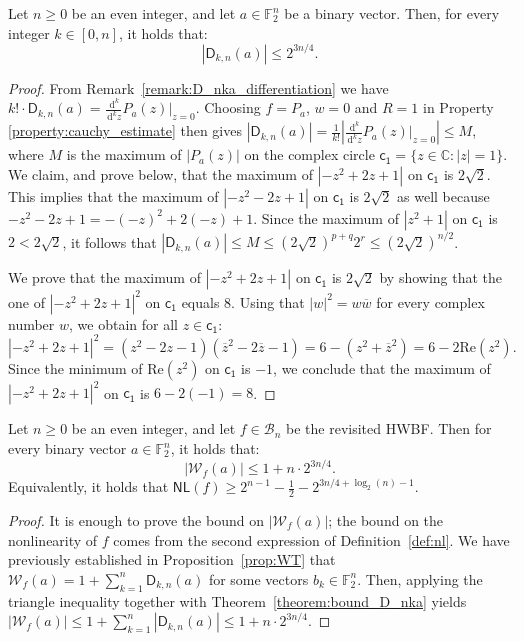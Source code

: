 \documentclass[runningheads,orivec]{llncs}
\newcommand{\BN}{\mathcal{B}_n}
\newcommand{\C}{\mathbb{C}}
\newcommand{\dd}{\,\mathrm d}
\newcommand{\dis}{\mathsf{c_1}}
\newcommand{\Dkna}[3]{\mathsf{D}_{#2,#1}(a)}
\newcommand{\F}{\mathbb{F}}
\newcommand{\hwbf}{\textsf{HWBF}}
\newcommand{\NL}{\mathsf{NL}}
\newcommand{\wt}[1]{\mathcal W_{#1}}
\let\leq=\leqslant
\let\geq=\geqslant
\begin{document}
    \begin{theorem}\label{theorem:bound_D_nka}
        Let $n\geq 0$ be an even integer, and let $a\in\F_2^n$ be a binary vector. Then, for every integer $k\in[0,n]$, it holds that:
        \[
            |\Dkna nka|\leq 2^{3n/4}.
        \]
    \end{theorem}
    
    \begin{proof}
        From Remark~\ref{remark:D_nka_differentiation} we have $k!\cdot\Dkna nka=\frac{\dd^k}{\dd^k z}P_a(z)\vert_{z=0}$. Choosing $f=P_a$, $w=0$ and $R=1$ in Property \ref{property:cauchy_estimate} then gives $|\Dkna nka|=\frac{1}{k!}\left|\frac{\dd^k}{\dd^k z}P_a(z)\vert_{z=0}\right|\leq M$, where $M$ is the maximum of $|P_a(z)|$ on the complex circle $\dis=\{ z \in \C: |z|=1  \}$. We claim, and prove below, that the maximum of $\left|-z^2+2z+1\right|$ on $\dis$ is $2\sqrt 2$. This implies that the maximum of $\left|-z^2-2z+1\right|$ on $\dis$ is $2\sqrt 2$ as well because $-z^2-2z+1=-(-z)^2+2(-z)+1$. Since the maximum of $\left|z^2+1\right|$ on $\dis$ is $2<2\sqrt 2$, it follows that $|\Dkna nka|\leq M\leq (2\sqrt 2)^{p+q}2^r\leq (2\sqrt 2)^{n/2}$.
    
    	We prove that the maximum of $|-z^2+2z+1|$ on $\dis$ is $2\sqrt 2$ by showing that the one of $|-z^2+2z+1|^2$ on $\dis$ equals $8$. Using that $|w|^2=w\overline w$ for every complex number $w$, we obtain for all $z\in \dis$:
        \[
            \left|-z^2+2z+1\right|^2=\left(z^2-2z-1\right)\left(\overline z^2-2\overline z-1\right)=6-\left(z^2+\overline z^2\right)=6-2\mathrm{Re}\left(z^2\right).
        \]
        Since the minimum of $\mathrm{Re}\left(z^2\right)$ on $\dis$ is $-1$, we conclude that the maximum of $|-z^2+2z+1|^2$ on $\dis$ is $6-2(-1)=8$.
    \end{proof}
    
    \begin{corollary}\label{cor:bound_walsh_cauchy}
        Let $n\geq 0$ be an even integer, and let $f\in\BN$ be the revisited \hwbf{}. Then for every binary vector $a\in\F_2^n$, it holds that:
        \[
            |\wt f(a)|\leq 1+n\cdot 2^{3n/4}.
        \]
        Equivalently, it holds that $\NL(f)\geq 2^{n-1} - \frac{1}{2} -2^{3n/4 + \log_2(n) -1}$.
    \end{corollary}
    
    \begin{proof}
        It is enough to prove the bound on $|\wt f(a)|$; the bound on the nonlinearity of $f$ comes from the second expression of Definition~\ref{def:nl}. We have previously established in Proposition~\ref{prop:WT} that $\wt{f}(a)=1+\sum_{k=1}^n\Dkna{n}{k}{b_k}$ for some vectors $b_k\in\F_2^n$. Then, applying the triangle inequality together with Theorem~\ref{theorem:bound_D_nka} yields $|\wt{f}(a)|\leq 1+\sum_{k=1}^n\left|\Dkna{n}{k}{b_k}\right|\leq 1+ n\cdot 2^{3n/4}$.
    \end{proof}
    
\end{document}
